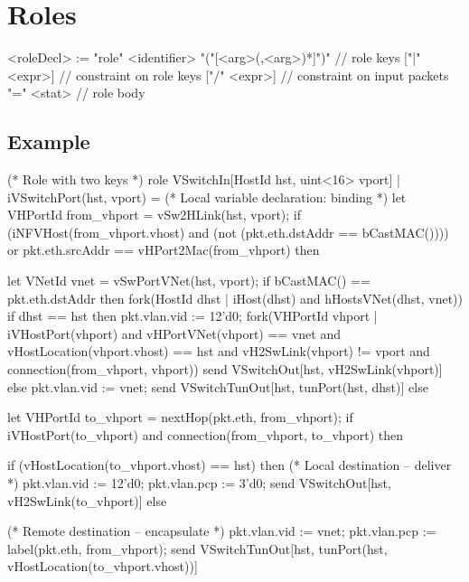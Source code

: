 \documentclass{report}
\begin{document}
\section{Roles}

\begin{bnflisting}{}
<roleDecl> := "role" <identifier> 
              "("[<arg>(,<arg>)*]")" // role keys
              ["|" <expr>]    // constraint on role keys
              ["/" <expr>]    // constraint on input packets
              "=" <stat>      // role body
\end{bnflisting}

\subsection*{Example}

\begin{ccnlisting}{}
(* Role with two keys *)
role VSwitchIn[HostId hst, uint<16> vport] | iVSwitchPort(hst, vport) = 
    (* Local variable declaration: binding *)
    let VHPortId from_vhport = vSw2HLink(hst, vport);
    if (iNFVHost(from_vhport.vhost) and (not (pkt.eth.dstAddr == bCastMAC()))) or 
       pkt.eth.srcAddr == vHPort2Mac(from_vhport) then {
        let VNetId vnet = vSwPortVNet(hst, vport);
        if bCastMAC() == pkt.eth.dstAddr then {
            fork(HostId dhst | iHost(dhst) and hHostsVNet(dhst, vnet)) {
                if dhst == hst then {
                    pkt.vlan.vid := 12'd0;
                    fork(VHPortId vhport | iVHostPort(vhport) and 
                                           vHPortVNet(vhport) == vnet and 
                                           vHostLocation(vhport.vhost) == hst and 
                                           vH2SwLink(vhport) != vport and
                                           connection(from_vhport, vhport)) {
                        send VSwitchOut[hst, vH2SwLink(vhport)]
                    }
                } else {
                    pkt.vlan.vid := vnet;
                    send VSwitchTunOut[hst, tunPort(hst, dhst)]
                }
            }
        } else {
            let VHPortId to_vhport = nextHop(pkt.eth, from_vhport);
            if iVHostPort(to_vhport) and connection(from_vhport, to_vhport) then {
                if (vHostLocation(to_vhport.vhost) == hst) then { 
                    (* Local destination -- deliver *)
                    pkt.vlan.vid := 12'd0;
                    pkt.vlan.pcp := 3'd0;
                    send VSwitchOut[hst, vH2SwLink(to_vhport)]
                } else {
                    (* Remote destination -- encapsulate *)
                    pkt.vlan.vid := vnet;
                    pkt.vlan.pcp := label(pkt.eth, from_vhport);
                    send VSwitchTunOut[hst, 
                                       tunPort(hst, 
                                               vHostLocation(to_vhport.vhost))]

                }
            }
        }
    }
\end{ccnlisting}
\end{document}
